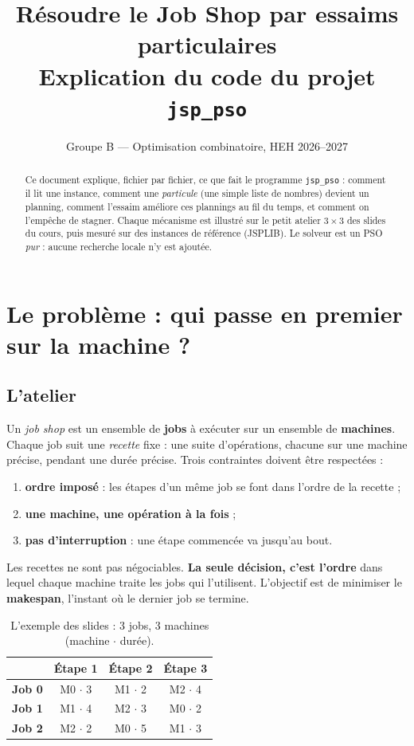\documentclass[11pt,a4paper]{article}
\title{\textbf{Résoudre le Job Shop par essaims particulaires}\\[4pt]
  \large Explication du code du projet \texttt{jsp\_pso}}
\author{Groupe B --- Optimisation combinatoire, HEH 2026--2027}
\date{}
\begin{document}
\maketitle

\begin{abstract}
Ce document explique, fichier par fichier, ce que fait le programme \texttt{jsp\_pso} :
comment il lit une instance, comment une \emph{particule} (une simple liste de nombres)
devient un planning, comment l'essaim améliore ces plannings au fil du temps, et
comment on l'empêche de stagner. Chaque mécanisme est illustré sur le petit atelier
$3\times3$ des slides du cours, puis mesuré sur des instances de référence (JSPLIB).
Le solveur est un PSO \emph{pur} : aucune recherche locale n'y est ajoutée.
\end{abstract}

\tableofcontents
\newpage

\section{Le problème : qui passe en premier sur la machine ?}

\subsection{L'atelier}

Un \emph{job shop} est un ensemble de \textbf{jobs} à exécuter sur un ensemble de
\textbf{machines}. Chaque job suit une \emph{recette} fixe : une suite d'opérations,
chacune sur une machine précise, pendant une durée précise. Trois contraintes doivent
être respectées :
\begin{enumerate}
  \item \textbf{ordre imposé} : les étapes d'un même job se font dans l'ordre de la recette ;
  \item \textbf{une machine, une opération à la fois} ;
  \item \textbf{pas d'interruption} : une étape commencée va jusqu'au bout.
\end{enumerate}
Les recettes ne sont pas négociables. \textbf{La seule décision, c'est l'ordre} dans
lequel chaque machine traite les jobs qui l'utilisent. L'objectif est de minimiser le
\textbf{makespan}, l'instant où le dernier job se termine.

\begin{table}[h]
\centering
\caption{L'exemple des slides : 3 jobs, 3 machines (machine $\cdot$ durée).}
\label{tab:recettes}
\begin{tabular}{lccc}
\toprule
 & Étape 1 & Étape 2 & Étape 3\\
\midrule
\textcolor{jzero}{\textbf{Job 0}} & M0 $\cdot$ 3 & M1 $\cdot$ 2 & M2 $\cdot$ 4\\
\textcolor{jun}{\textbf{Job 1}}   & M1 $\cdot$ 4 & M2 $\cdot$ 3 & M0 $\cdot$ 2\\
\textcolor{jdeux}{\textbf{Job 2}} & M2 $\cdot$ 2 & M0 $\cdot$ 5 & M1 $\cdot$ 3\\
\bottomrule
\end{tabular}
\end{table}
\end{document}
